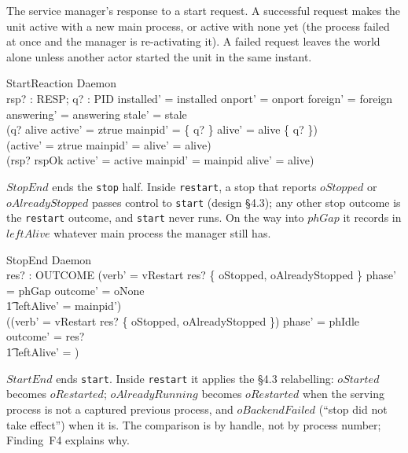 \documentclass[a4paper,10pt,fleqn]{article}
\begin{document}
The service manager's response to a start request. A successful request makes
the unit active with a new main process, or active with none yet (the process
failed at once and the manager is re-activating it). A failed request leaves
the world alone unless another actor started the unit in the same instant.

\begin{schema}{StartReaction}
  \Delta Daemon \\
  rsp? : RESP; q? : PID
\where
  installed' = installed \land onport' = onport \land foreign' = foreign \\
  answering' = answering \land stale' = stale \\
  (q? \notin alive \land active' = ztrue \land mainpid' = \{ q? \} \land
    alive' = alive \cup \{ q? \}) \lor \\
  (active' = ztrue \land mainpid' = \emptyset \land alive' = alive) \lor \\
  (rsp? \neq rspOk \land active' = active \land mainpid' = mainpid \land
    alive' = alive)
\end{schema}

$StopEnd$ ends the \texttt{stop} half. Inside \texttt{restart}, a stop that
reports $oStopped$ or $oAlreadyStopped$ passes control to \texttt{start}
(design \S4.3); any other stop outcome is the \texttt{restart} outcome, and
\texttt{start} never runs. On the way into $phGap$ it records in $leftAlive$
whatever main process the manager still has.

\begin{schema}{StopEnd}
  \Delta Daemon \\
  res? : OUTCOME
\where
  (verb' = vRestart \land res? \in \{ oStopped, oAlreadyStopped \} \land
    phase' = phGap \land outcome' = oNone \land \\
  \t1 leftAlive' = mainpid') \lor \\
  (\lnot (verb' = vRestart \land res? \in \{ oStopped, oAlreadyStopped \})
    \land phase' = phIdle \land outcome' = res? \land \\
  \t1 leftAlive' = \emptyset)
\end{schema}

$StartEnd$ ends \texttt{start}. Inside \texttt{restart} it applies the \S4.3
relabelling: $oStarted$ becomes $oRestarted$; $oAlreadyRunning$ becomes
$oRestarted$ when the serving process is not a captured previous process, and
$oBackendFailed$ (``stop did not take effect'') when it is. The comparison is
by handle, not by process number; Finding~F4 explains why.
\end{document}

